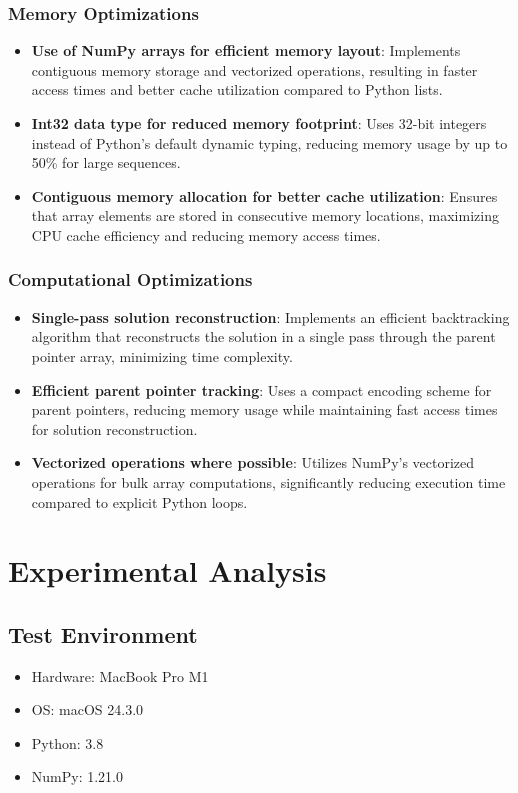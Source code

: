 \documentclass[12pt]{article}
\begin{document}
\subsubsection{Memory Optimizations}
\begin{itemize}
    \item \textbf{Use of NumPy arrays for efficient memory layout}: Implements contiguous memory storage and vectorized operations, resulting in faster access times and better cache utilization compared to Python lists.
    \item \textbf{Int32 data type for reduced memory footprint}: Uses 32-bit integers instead of Python's default dynamic typing, reducing memory usage by up to 50\% for large sequences.
    \item \textbf{Contiguous memory allocation for better cache utilization}: Ensures that array elements are stored in consecutive memory locations, maximizing CPU cache efficiency and reducing memory access times.
\end{itemize}

\subsubsection{Computational Optimizations}
\begin{itemize}
    \item \textbf{Single-pass solution reconstruction}: Implements an efficient backtracking algorithm that reconstructs the solution in a single pass through the parent pointer array, minimizing time complexity.
    \item \textbf{Efficient parent pointer tracking}: Uses a compact encoding scheme for parent pointers, reducing memory usage while maintaining fast access times for solution reconstruction.
    \item \textbf{Vectorized operations where possible}: Utilizes NumPy's vectorized operations for bulk array computations, significantly reducing execution time compared to explicit Python loops.
\end{itemize}

\section{Experimental Analysis}

\subsection{Test Environment}
\begin{itemize}
    \item Hardware: MacBook Pro M1
    \item OS: macOS 24.3.0
    \item Python: 3.8
    \item NumPy: 1.21.0
\end{itemize}
\end{document}
